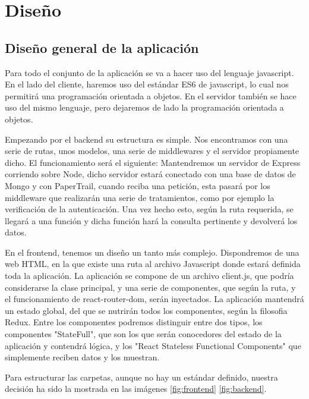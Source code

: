 \chapter{Diseño}
\section{Diseño general de la aplicación}
Para todo el conjunto de la aplicación se va a hacer uso del lenguaje javascript. En el lado del cliente, haremos uso del estándar ES6 de javascript, lo cual nos permitirá una programación orientada a objetos. En el servidor también se hace uso del mismo lenguaje, pero dejaremos de lado la programación orientada a objetos.

Empezando por el backend su estructura es simple. Nos encontramos con una serie de rutas, unos modelos, una serie de \glspl{middleware} y el servidor propiamente dicho. El funcionamiento será el siguiente: Mantendremos un servidor de Express corriendo sobre Node, dicho servidor estará conectado con una base de datos de Mongo y con PaperTrail, cuando reciba una petición, esta pasará por los middleware que realizarán una serie de tratamientos, como por ejemplo la verificación de la autenticación. Una vez hecho esto, según la ruta requerida, se llegará a una función y dicha función hará la consulta pertinente y devolverá los datos.

En el frontend, tenemos un diseño un tanto más complejo. Dispondremos de una web HTML, en la que existe una ruta al archivo Javascript donde estará definida toda la aplicación. La aplicación se compone de un archivo client.js, que podría considerarse la clase principal, y una serie de componentes, que según la ruta, y el funcionamiento de react-router-dom, serán inyectados. La aplicación mantendrá un estado global, del que se nutrirán todos los componentes, según la filosofia Redux. Entre los componentes podremos distinguir entre dos tipos, los componentes "StateFull", que son los que serán conocedores del estado de la aplicación y contendrá lógica, y los "React Stateless Functional Components" que simplemente reciben datos y los muestran.


Para estructurar las carpetas, aunque no hay un estándar definido, nuestra decisión ha sido la mostrada en las imágenes \ref{fig:frontend} \ref{fig:backend}.

